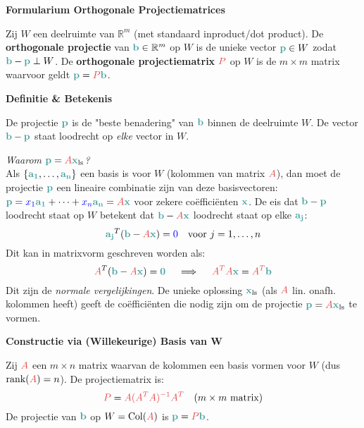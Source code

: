 \documentclass[12pt]{article}
\renewcommand{\vec}[1]{\textcolor{vectorTeal}{\mathbf{#1}}}
\newcommand{\scalar}[1]{\textcolor{scalarBrightBlue}{#1}}
\newcommand{\mat}[1]{\textcolor{matrixSoftRed}{#1}}
\DeclareMathOperator{\Col}{Col}
\begin{document}
\begin{center}
\Large \textbf{Formularium Orthogonale Projectiematrices}
\end{center}

\vspace{1em} %

Zij $W$ een deelruimte van $\mathbb{R}^m$ (met standaard inproduct/dot product). De \textbf{orthogonale projectie} van $\vec{b} \in \mathbb{R}^m$ op $W$ is de unieke vector $\vec{p} \in W$ zodat $\vec{b} - \vec{p} \perp W$. De \textbf{orthogonale projectiematrix} $\mat{P}$ op $W$ is de $m \times m$ matrix waarvoor geldt $\vec{p} = \mat{P}\vec{b}$.

\vspace{1.5em} %
{\centering
\textcolor{headerBrown}{\large\textbf{Definitie & Betekenis}}
\par
}%
De projectie $\vec{p}$ is de "beste benadering" van $\vec{b}$ binnen de deelruimte $W$. De vector $\vec{b} - \vec{p}$ staat loodrecht op \textit{elke} vector in $W$.

\textit{Waarom $\vec{p} = \mat{A}\vec{x}_{\text{ls}}$?}\\
Als $\{\vec{a_1}, \dots, \vec{a_n}\}$ een basis is voor $W$ (kolommen van matrix $\mat{A}$), dan moet de projectie $\vec{p}$ een lineaire combinatie zijn van deze basisvectoren: $\vec{p} = \scalar{x_1}\vec{a_1} + \dots + \scalar{x_n}\vec{a_n} = \mat{A}\vec{x}$ voor zekere coëfficiënten $\vec{x}$.
De eis dat $\vec{b} - \vec{p}$ loodrecht staat op $W$ betekent dat $\vec{b} - \mat{A}\vec{x}$ loodrecht staat op elke $\vec{a_j}$:
\[ \vec{a_j}^T (\vec{b} - \mat{A}\vec{x}) = \scalar{0} \quad \text{voor } j = 1, \dots, n \]
Dit kan in matrixvorm geschreven worden als:
\[ \mat{A}^T (\vec{b} - \mat{A}\vec{x}) = \vec{0} \quad \implies \quad \mat{A^T A} \vec{x} = \mat{A^T} \vec{b} \]
Dit zijn de \textit{normale vergelijkingen}. De unieke oplossing $\vec{x}_{\text{ls}}$ (als $\mat{A}$ lin. onafh. kolommen heeft) geeft de coëfficiënten die nodig zijn om de projectie $\vec{p} = \mat{A}\vec{x}_{\text{ls}}$ te vormen.

\vspace{1.5em} %
{\centering
\textcolor{headerBrown}{\large\textbf{Constructie via (Willekeurige) Basis van W}}
\par
}%
Zij $\mat{A}$ een $m \times n$ matrix waarvan de kolommen een basis vormen voor $W$ (dus $\text{rank}(\mat{A}) = n$). De projectiematrix is:
\[
\mat{P} = \mat{A (\mat{A^T A})^{-1} A^T} \quad (m \times m \text{ matrix})
\]
De projectie van $\vec{b}$ op $W = \Col(\mat{A})$ is $\vec{p} = \mat{P}\vec{b}$.
\end{document}
